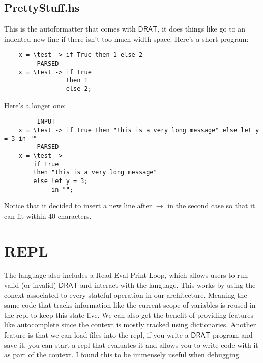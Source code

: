\documentclass{article} %
\newcommand{\DRAT}{\mathsf{DRAT}}
\begin{document}
    \subsection{PrettyStuff.hs}
    This is the autoformatter that comes with $\DRAT$, it does things like go to an indented new line if there isn't too much width space. Here's a short program:
    \begin{verbatim}
    x = \test -> if True then 1 else 2
    -----PARSED-----
    x = \test -> if True
                 then 1
                 else 2;
    \end{verbatim}
    Here's a longer one:
    \begin{verbatim}
    -----INPUT-----
    x = \test -> if True then "this is a very long message" else let y = 3 in ""
    -----PARSED-----
    x = \test ->
        if True
        then "this is a very long message"
        else let y = 3;
             in "";
    \end{verbatim}
    Notice that it decided to insert a new line after $\to$ in the second case so that it can fit within 40 characters.
\section {REPL}
    The language also includes a Read Eval Print Loop, which allows users to run valid (or invalid) $\DRAT$ and interact with the language. This works by using the conext associated to every stateful operation in our architecture. Meaning the same code that tracks information like the current scope of variables is reused in the repl to keep this state live. We can also get the benefit of providing features like autocomplete since the context is mostly tracked using dictionaries. Another feature is that we can load files into the repl, if you write a $\DRAT$ program and save it, you can start a repl that evaluates it and allows you to write code with it as part of the context. I found this to be immensely useful when debugging.
\end{document}
